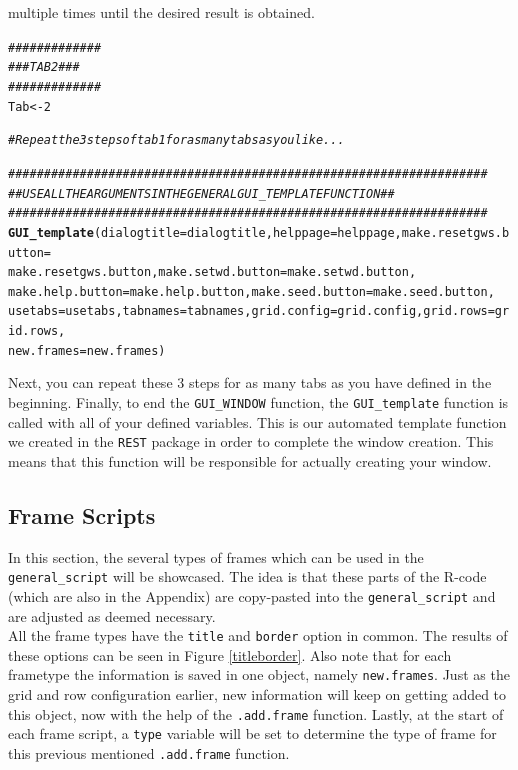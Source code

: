 \documentclass[a4paper]{article}\usepackage[]{graphicx}\usepackage[]{color}
\makeatletter
\newcommand{\hlnum}[1]{\textcolor[rgb]{0.686,0.059,0.569}{#1}}%
\newcommand{\hlcom}[1]{\textcolor[rgb]{0.678,0.584,0.686}{\textit{#1}}}%
\newcommand{\hlstd}[1]{\textcolor[rgb]{0.345,0.345,0.345}{#1}}%
\newcommand{\hlkwb}[1]{\textcolor[rgb]{0.69,0.353,0.396}{#1}}%
\newcommand{\hlkwc}[1]{\textcolor[rgb]{0.333,0.667,0.333}{#1}}%
\newcommand{\hlkwd}[1]{\textcolor[rgb]{0.737,0.353,0.396}{\textbf{#1}}}%
\newenvironment{kframe}{%
 \def\at@end@of@kframe{}%
 \ifinner\ifhmode%
  \def\at@end@of@kframe{\end{minipage}}%
  \begin{minipage}{\columnwidth}%
 \fi\fi%
 \def\FrameCommand##1{\hskip\@totalleftmargin \hskip-\fboxsep
 \colorbox{shadecolor}{##1}\hskip-\fboxsep
     \hskip-\linewidth \hskip-\@totalleftmargin \hskip\columnwidth}%
 \MakeFramed {\advance\hsize-\width
   \@totalleftmargin\z@ \linewidth\hsize
   \@setminipage}}%
 {\par\unskip\endMakeFramed%
 \at@end@of@kframe}
\newenvironment{knitrout}{}{} %
\makeatother
\begin{document}
multiple times until the desired result is obtained.
\begin{knitrout}
\color{fgcolor}\begin{kframe}
\begin{alltt}
\hlcom{#############}
\hlcom{### TAB 2 ###}
\hlcom{#############}
\hlstd{Tab} \hlkwb{<-} \hlnum{2}

\hlcom{# Repeat the 3 steps of tab 1 for as many tabs as you like...}


\hlcom{###################################################################}
\hlcom{## USE ALL THE ARGUMENTS IN THE GENERAL GUI_TEMPLATE FUNCTION    ##}
\hlcom{###################################################################}
\hlkwd{GUI_template}\hlstd{(}\hlkwc{dialogtitle}\hlstd{=dialogtitle,}\hlkwc{helppage}\hlstd{=helppage,}\hlkwc{make.resetgws.button}\hlstd{=}
                \hlstd{make.resetgws.button,}\hlkwc{make.setwd.button}\hlstd{=make.setwd.button,}
                \hlkwc{make.help.button}\hlstd{=make.help.button,}\hlkwc{make.seed.button}\hlstd{=make.seed.button,}
                \hlkwc{usetabs}\hlstd{=usetabs,}\hlkwc{tabnames}\hlstd{=tabnames,}\hlkwc{grid.config}\hlstd{=grid.config,}\hlkwc{grid.rows}\hlstd{=grid.rows,}
                \hlkwc{new.frames}\hlstd{=new.frames)}
\end{alltt}
\end{kframe}
\end{knitrout}
\noindent Next, you can repeat these 3 steps for as many tabs as you have
defined in the beginning. Finally, to end the \verb|GUI_WINDOW| function, the
\verb|GUI_template| function is called with all of your defined variables. 
This is our automated template function we created in the \verb|REST| package in
order to complete the window creation. This means that this function will be responsible
for actually creating your window.

\subsection{Frame Scripts}
In this section, the several types of frames which can be used in the
\verb|general_script| will be showcased. The idea is that these parts of the
R-code (which are also in the Appendix) are copy-pasted into the
\verb|general_script| and are adjusted as deemed necessary. \\
All the frame types have the \verb|title| and
\verb|border| option in common. The results of these options can be seen in
Figure \ref{titleborder}. Also note that for each frametype the information is
saved in one object, namely \verb|new.frames|. Just as the grid and row configuration
earlier, new information will keep on getting added to this object, now with
the help of the \verb|.add.frame| function. Lastly, at the start of each frame
script, a \verb|type| variable will be set to determine the type of frame for
this previous mentioned \verb|.add.frame| function.
\end{document}
